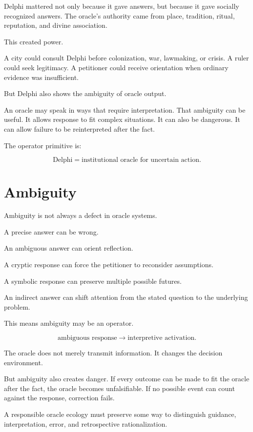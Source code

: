 \documentclass[11pt]{book}
\begin{document}
Delphi mattered not only because it gave answers, but because it gave socially recognized answers. The oracle's authority came from place, tradition, ritual, reputation, and divine association.

This created power.

A city could consult Delphi before colonization, war, lawmaking, or crisis. A ruler could seek legitimacy. A petitioner could receive orientation when ordinary evidence was insufficient.

But Delphi also shows the ambiguity of oracle output.

An oracle may speak in ways that require interpretation. That ambiguity can be useful. It allows response to fit complex situations. It can also be dangerous. It can allow failure to be reinterpreted after the fact.

The operator primitive is:

\[
\text{Delphi} = \text{institutional oracle for uncertain action}.
\]

\section{Ambiguity}

Ambiguity is not always a defect in oracle systems.

A precise answer can be wrong.

An ambiguous answer can orient reflection.

A cryptic response can force the petitioner to reconsider assumptions.

A symbolic response can preserve multiple possible futures.

An indirect answer can shift attention from the stated question to the underlying problem.

This means ambiguity may be an operator.

\[
\text{ambiguous response}
\rightarrow
\text{interpretive activation}.
\]

The oracle does not merely transmit information. It changes the decision environment.

But ambiguity also creates danger. If every outcome can be made to fit the oracle after the fact, the oracle becomes unfalsifiable. If no possible event can count against the response, correction fails.

A responsible oracle ecology must preserve some way to distinguish guidance, interpretation, error, and retrospective rationalization.
\end{document}
